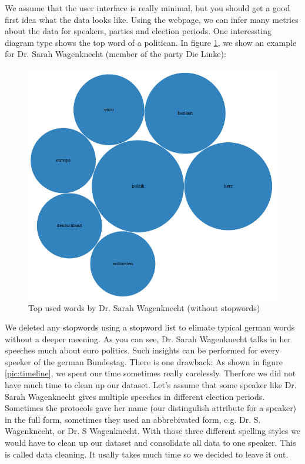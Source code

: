 \documentclass[12pt,paper=a4,nenglish]{scrreprt}
\begin{document}
We assume that the user interface is really minimal, but you should get a good
first idea what the data looks like. Using the webpage, we can infer many
metrics about the data for speakers, parties and election periods. 
One interessting diagram type shows the top word of a politican. In
figure \ref{pic:wagenknecht_topwords}, we show an example for Dr. Sarah
Wagenknecht (member of the party Die Linke):
\begin{figure}[H] 
	\centering
	\includegraphics[scale=0.6]{res/wagenknecht_topwords.png}
	\caption{Top used words by Dr. Sarah Wagenknecht (without stopwords)}%
	\label{pic:wagenknecht_topwords}%
\end{figure}%
We deleted any stopwords using a stopword list to elimate typical german words
without a deeper meening. As you can see, Dr. Sarah Wagenknecht talks in her
speeches much about euro politics. Such insights can be performed for every
speeker of the german Bundestag. There is one drawback: As shown in figure
\ref{pic:timeline}, we spent our time sometimes really carelessly. Therfore we
did not have much time to clean up our dataset. Let's assume that some speaker
like Dr. Sarah Wagenknecht gives multiple speeches in different election
periods. Sometimes the protocols gave her name (our distingulish attribute for
a speaker) in the full form, sometimes they used an abbrebivated form, e.g. Dr.
S. Wagenknecht, or Dr. S Wagenknecht. With those three different spelling styles
we would have to clean up our dataset and consolidate all data to one speaker.
This is called data cleaning. It usally takes much time so we decided to leave
it out. 
\end{document}
